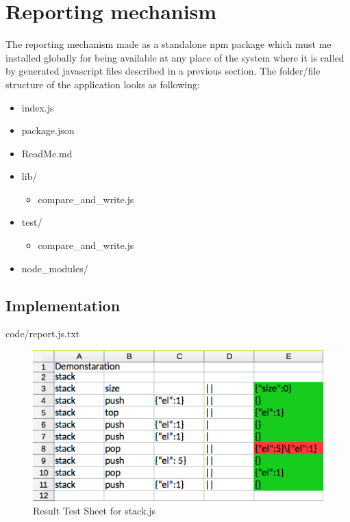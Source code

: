 \section{Reporting mechanism}
The reporting mechanism made as a standalone npm package which must me installed globally for being available at any place of the system where it is called by generated javascript files described in a previous section. 
The folder/file structure of the application looks as following:
\begin{itemize}
	\item index.js
	\item package.json
	\item ReadMe.md
	\item lib/
	\begin{itemize}
		\item compare\_and\_write.js
	\end{itemize}
	\item test/
	\begin{itemize}
		\item compare\_and\_write.js
	\end{itemize}
	\item node\_modules/
\end{itemize}

\subsection{Implementation}

{code/report.js.txt}

\begin{figure}[H]
	\centering
	\includegraphics[width=\linewidth]{grafiken/testSheetResult.png}
	\caption{Result Test Sheet for stack.js}
	\label{fig:resultTestSheet}
\end{figure}


